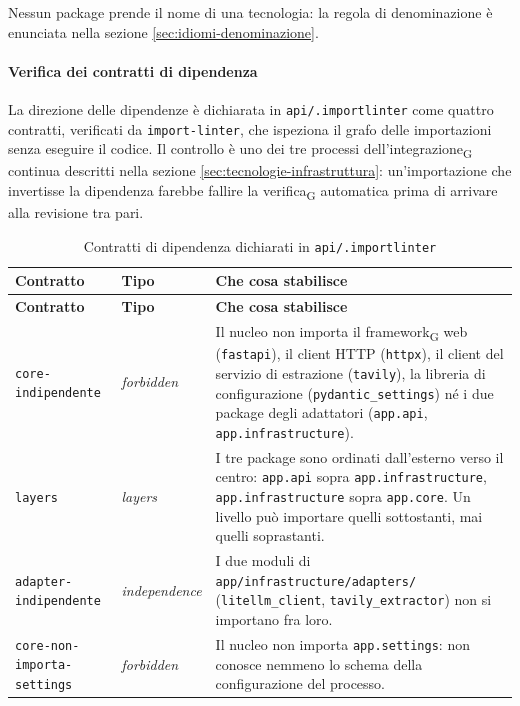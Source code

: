 \documentclass[a4paper, 10pt]{article}
\begin{document}
\noindent Nessun package prende il nome di una tecnologia: la regola di denominazione è enunciata nella sezione \ref{sec:idiomi-denominazione}.

\paragraph{Verifica dei contratti di dipendenza}
La direzione delle dipendenze è dichiarata in \texttt{api/.importlinter} come quattro contratti, verificati da \texttt{import-linter}, che ispeziona il grafo delle importazioni senza eseguire il codice. Il controllo è uno dei tre processi dell'integrazione\textsubscript{G} continua descritti nella sezione \ref{sec:tecnologie-infrastruttura}: un'importazione che invertisse la dipendenza farebbe fallire la verifica\textsubscript{G} automatica prima di arrivare alla revisione tra pari.

\begingroup
\small
\setlength{\tabcolsep}{4pt}
\begin{longtable}{|p{3.2cm}|p{2.1cm}|p{8.2cm}|}
    \caption{Contratti di dipendenza dichiarati in \texttt{api/.importlinter}}\label{tab:contratti-dipendenza}\\
    \hline
    \textbf{Contratto} & \textbf{Tipo} & \textbf{Che cosa stabilisce} \\
    \hline
    \endfirsthead
    \hline
    \textbf{Contratto} & \textbf{Tipo} & \textbf{Che cosa stabilisce} \\
    \hline
    \endhead
    \texttt{core-\newline indipendente} & \textit{forbidden} & Il nucleo non importa il framework\textsubscript{G} web (\texttt{fastapi}), il client HTTP (\texttt{httpx}), il client del servizio di estrazione (\texttt{tavily}), la libreria di configurazione (\texttt{pydantic\_settings}) né i due package degli adattatori (\texttt{app.api}, \texttt{app.infrastructure}). \\ \hline

    \texttt{layers} & \textit{layers} & I tre package sono ordinati dall'esterno verso il centro: \texttt{app.api} sopra \texttt{app.infrastructure}, \texttt{app.infrastructure} sopra \texttt{app.core}. Un livello può importare quelli sottostanti, mai quelli soprastanti. \\ \hline

    \texttt{adapter-\newline indipendente} & \textit{independence} & I due moduli di \texttt{app/infrastructure/adapters/} (\texttt{litellm\_client}, \texttt{tavily\_extractor}) non si importano fra loro. \\ \hline

    \texttt{core-non-\newline importa-settings} & \textit{forbidden} & Il nucleo non importa \texttt{app.settings}: non conosce nemmeno lo schema della configurazione del processo. \\ \hline
\end{longtable}
\endgroup
\end{document}
